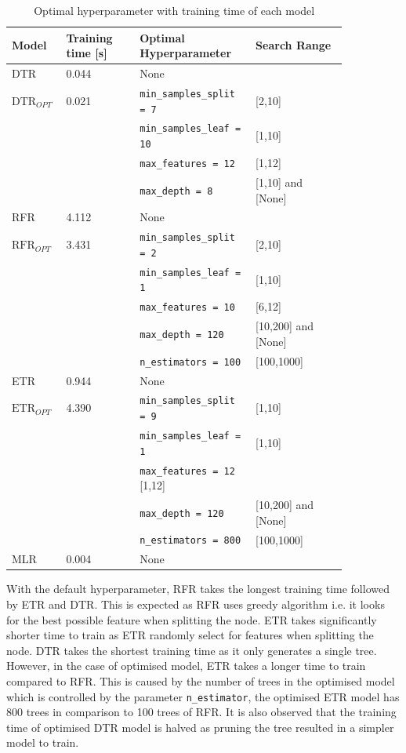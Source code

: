 \begin{table}[ht]
    \footnotesize
    \centering
    {\begin{tabular}{ p{0.1\linewidth} p{0.2\linewidth}  p{0.3\linewidth} p{0.25\linewidth}}
    \hline
    Model & Training time [s] &  Optimal Hyperparameter & Search Range \\
    \hline
    DTR & 0.044 & None \\
    $\text{DTR}_{OPT}$ & 0.021  & {\tt min\_samples\_split = 7} & [2,10] \\
    &&{\tt min\_samples\_leaf = 10} & [1,10] \\
    &&{\tt max\_features = 12} & [1,12]\\
    &&{\tt max\_depth = 8} & [1,10] and [None]\\
    RFR & 4.112 & None \\
    $\text{RFR}_{OPT}$ & 3.431  & {\tt min\_samples\_split = 2} & [2,10]\\
    &&{\tt min\_samples\_leaf = 1} & [1,10]\\
    &&{\tt max\_features = 10} & [6,12]\\
    &&{\tt max\_depth = 120} & [10,200] and [None]\\
    &&{\tt n\_estimators = 100} & [100,1000]\\
    ETR & 0.944 & None \\
    $\text{ETR}_{OPT}$ & 4.390  & {\tt min\_samples\_split = 9} & [1,10]\\
    &&{\tt min\_samples\_leaf = 1} & [1,10]\\
    &&{\tt max\_features = 12} [1,12]\\
    &&{\tt max\_depth = 120} & [10,200] and [None]\\
    &&{\tt n\_estimators = 800} & [100,1000]\\
    MLR & 0.004  & None\\
    \hline
    \end{tabular}}
\caption{Optimal hyperparameter with training time of each model}\label{tbl:hpo_optimal}
\end{table}

With the default hyperparameter, RFR takes the longest training time followed by ETR and DTR. This is expected as RFR uses greedy algorithm i.e. it looks for the best possible feature when splitting the node. ETR takes significantly shorter time to train as ETR randomly select for features when splitting the node. DTR takes the shortest training time as it only generates a single tree. However, in the case of optimised model, ETR takes a longer time to train compared to RFR. This is caused by the number of trees in the optimised model which is controlled by the parameter {\tt n\_estimator}, the optimised ETR model has 800 trees in comparison to 100 trees of RFR. It is also observed that the training time of optimised DTR model is halved as pruning the tree resulted in a simpler model to train. \\

